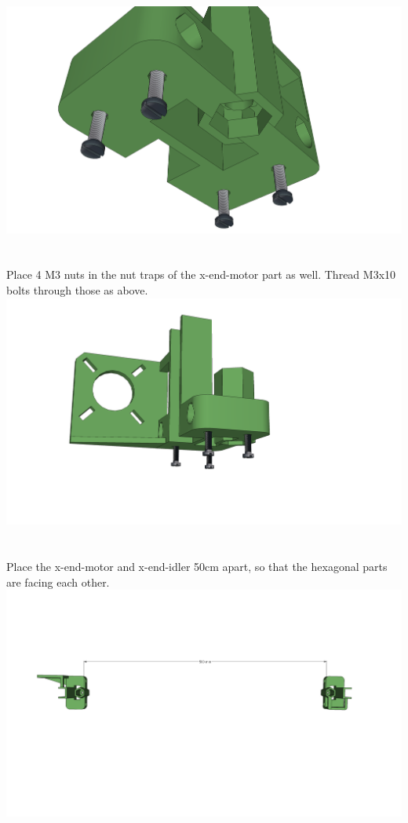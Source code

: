 \documentclass[twoside,openany,a4paper,titlepage]{memoir}
\begin{document}
	\includegraphics[width=1\linewidth]{graphics/ch7_3_4.png}
	
	\section{}
	Place 4 M3 nuts in the nut traps of the x-end-motor part as well. Thread M3x10 bolts through those as
	above.\\
	\includegraphics[width=1\linewidth]{graphics/ch7_4.png}
	
	\section{}
	Place the x-end-motor and x-end-idler 50cm apart, so that the hexagonal parts are facing each other.\\
	\includegraphics[width=1\linewidth]{graphics/ch7_5.png}
	
\end{document}
